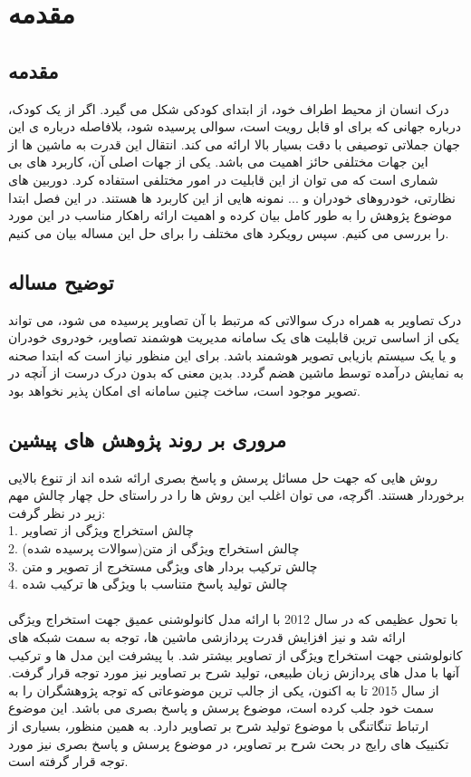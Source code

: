 \chapter{مقدمه}

\section{مقدمه}
درک انسان از محیط اطراف خود، از ابتدای کودکی شکل می گیرد. اگر از یک کودک، درباره جهانی که برای او قابل رویت است، سوالی پرسیده شود، بلافاصله درباره ی این جهان جملاتی توصیفی با دقت بسیار بالا ارائه می کند. انتقال این قدرت به ماشین ها از این جهات مختلفی حائز اهمیت می باشد. یکی از جهات اصلی آن، کاربرد های بی شماری است که می توان از این قابلیت در امور مختلفی استفاده کرد. دوربین های نظارتی، خودروهای خودران و ... نمونه هایی از این کاربرد ها هستند. در این فصل ابتدا موضوع پژوهش را به طور کامل بیان کرده و اهمیت ارائه راهکار مناسب در این مورد را بررسی می کنیم.
سپس رویکرد های مختلف را برای حل این مساله بیان می کنیم.
\section{توضیح مساله}\label{sec2}
درک تصاویر به همراه درک سوالاتی که مرتبط با آن تصاویر پرسیده می شود، می تواند یکی از اساسی ترین قابلیت های یک سامانه مدیریت هوشمند تصاویر، خودروی خودران و یا یک سیستم بازیابی تصویر هوشمند باشد.
برای این منظور نیاز است که ابتدا صحنه به نمایش درآمده توسط ماشین هضم گردد. بدین معنی که بدون درک درست از آنچه در تصویر موجود است، ساخت چنین سامانه ای امکان پذیر نخواهد بود. 

\section{مروری بر روند پژوهش های پیشین}
روش هایی که جهت حل مسائل پرسش و پاسخ بصری ارائه شده اند از تنوع بالایی برخوردار هستند. اگرچه، می توان اغلب این روش ها را در راستای حل چهار چالش مهم زیر در نظر گرفت:\\
1. چالش استخراج ویژگی از تصاویر\\
2. چالش استخراج ویژگی از متن(سوالات پرسیده شده)\\
3. چالش ترکیب بردار های ویژگی مستخرج از تصویر و متن\\
4. چالش تولید پاسخ متناسب با ویژگی ها ترکیب شده\\
\\
با تحول عظیمی که در سال 2012 با ارائه مدل کانولوشنی عمیق جهت استخراج ویژگی ارائه شد و نیز افزایش قدرت پردازشی ماشین ها، توجه به سمت شبکه های کانولوشنی جهت استخراج ویژگی از تصاویر بیشتر شد. با پیشرفت این مدل ها و ترکیب آنها با مدل های پردازش زبان طبیعی، تولید شرح بر تصاویر نیز مورد توجه قرار گرفت. از سال 2015 تا به اکنون، یکی از جالب ترین موضوعاتی که توجه پژوهشگران را به سمت خود جلب کرده است، موضوع پرسش و پاسخ بصری می باشد. این موضوع ارتباط تنگاتنگی با موضوع تولید شرح بر تصاویر دارد. به همین منظور، بسیاری از تکنییک های رایج در بحث شرح بر تصاویر، در موضوع پرسش و پاسخ بصری نیز مورد توجه قرار گرفته است.